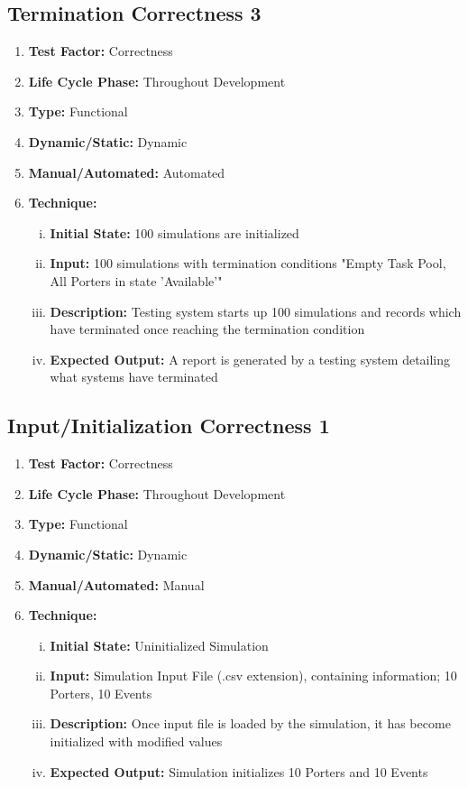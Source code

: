 \documentclass[paper=letter, fontsize=10pt]{scrartcl}
\numberwithin{equation}{section}		%
\numberwithin{figure}{section}			%
\numberwithin{table}{section}				%
\begin{document}
\subsection{Termination Correctness 3}
\begin{enumerate}[]
	\item \textbf{Test Factor:} Correctness
	\item \textbf{Life Cycle Phase:} Throughout Development
	\item \textbf{Type:} Functional
	\item \textbf{Dynamic/Static:} Dynamic
	\item \textbf{Manual/Automated:} Automated
	\item \textbf{Technique:}
		\begin{enumerate}[(i)]
			\item \textbf{Initial State:} 100 simulations are initialized 
			\item \textbf{Input:} 100 simulations with termination conditions "Empty Task Pool, All Porters in state 'Available'"
			\item \textbf{Description:} Testing system starts up 100 simulations and records which have terminated once reaching the termination condition 
			\item \textbf{Expected Output:} A report is generated by a testing system detailing what systems have terminated
		\end{enumerate}
\end{enumerate}

\subsection{Input/Initialization Correctness 1}
\begin{enumerate}[]
	\item \textbf{Test Factor:} Correctness  
	\item \textbf{Life Cycle Phase:} Throughout Development
	\item \textbf{Type:} Functional
	\item \textbf{Dynamic/Static:} Dynamic
	\item \textbf{Manual/Automated:} Manual
	\item \textbf{Technique:}
		\begin{enumerate}[(i)]
			\item \textbf{Initial State:} Uninitialized Simulation   
			\item \textbf{Input:} Simulation Input File (.csv extension), containing information; 10 Porters, 10 Events
			\item \textbf{Description:} Once input file is loaded by the simulation, it has become initialized with modified values
			\item \textbf{Expected Output:} Simulation initializes 10 Porters and 10 Events
		\end{enumerate}
\end{enumerate}
\end{document}
